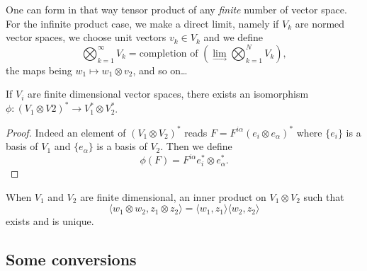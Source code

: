 One can form in that way tensor product of any \emph{finite} number of vector space. For the infinite product case, we make a direct limit, namely if $V_k$ are normed vector spaces, we choose unit vectors $v_k\in V_k$ and we define
\begin{equation}
\bigotimes_{k=1}^{\infty} V_k=\text{completion of }\left(\lim_{\rightarrow}\bigotimes_{k=1}^N V_k\right),
\end{equation}
the maps being $w_1\mapsto w_1\otimes v_2$, and so on\ldots

\begin{lemma}
If $V_i$ are finite dimensional vector spaces, there exists an isomorphism $\phi\colon (V_1\otimes V2)^*\to V_1^*\otimes V_2^*$. 
\end{lemma}
\begin{proof}
Indeed an element of $(V_1\otimes V_2)^*$ reads $F=F^{i\alpha}(e_i\otimes e_{\alpha})^*$ where $\{ e_i \}$ is a basis of $V_1$ and $\{ e_{\alpha} \}$ is a basis of $V_2$. Then we define
\[ 
  \phi(F)=F^{i\alpha}e_i^*\otimes e_{\alpha}^*.
\]
\end{proof}

\begin{lemma}
When $V_1$ and $V_2$ are finite dimensional, an inner product on $V_1\otimes V_2$ such that
\[ 
  \langle w_1\otimes w_2, z_1\otimes z_2\rangle =\langle w_1, z_1\rangle \langle w_2, z_2\rangle 
\]
exists and is unique.
\end{lemma}

\subsection{Some conversions}
\label{SUBSECooAASYooVHZEhz}

